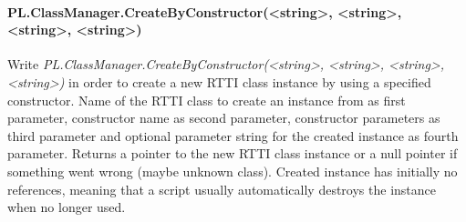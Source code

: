 \paragraph{PL.ClassManager.CreateByConstructor(<string>, <string>, <string>, <string>)}
Write \emph{PL.ClassManager.CreateByConstructor(<string>, <string>, <string>, <string>)} in order to create a new RTTI class instance by using a specified constructor. Name of the RTTI class to create an instance from as first parameter, constructor name as second parameter, constructor parameters as third parameter and optional parameter string for the created instance as fourth parameter. Returns a pointer to the new RTTI class instance or a null pointer if something went wrong (maybe unknown class). Created instance has initially no references, meaning that a script usually automatically destroys the instance when no longer used.
